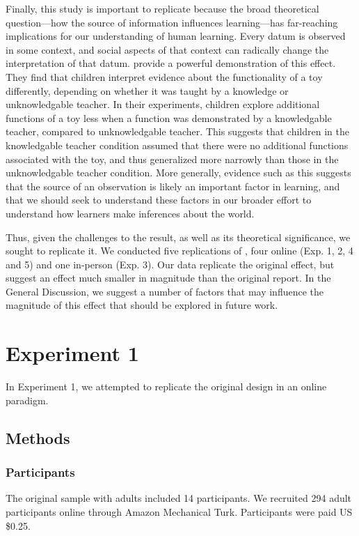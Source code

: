 \documentclass[man]{apa2}
\begin{document}
Finally, this study is important to replicate because the broad theoretical question---how the source of information influences learning---has far-reaching implications for our understanding of human learning. Every datum is observed in some context, and social aspects of that context can radically change the interpretation of that datum.  provide a powerful demonstration of this effect. They find that children interpret evidence about the functionality of a toy differently, depending on whether it was taught by a knowledge or unknowledgable teacher. In their experiments, children explore additional  functions of a toy less when a function was demonstrated by a knowledgable teacher, compared to unknowledgable teacher. This suggests that children in the knowledgable teacher condition assumed that there were no additional functions associated with the toy, and thus generalized more narrowly than those in the unknowledgable teacher condition. More generally, evidence such as this suggests that the source of an observation is likely an important factor in learning, and that we should seek to understand these factors in our broader effort to understand how learners make inferences about the world.

Thus, given the challenges to the  result, as well as its theoretical significance, we sought to replicate it. We conducted five replications of , four online (Exp. 1, 2,  4 and 5) and one in-person (Exp. 3). Our data replicate the original effect, but suggest an effect much smaller in magnitude than the original report. In the General Discussion, we suggest a number of factors that may influence the magnitude of this effect that should be explored in future work.
 
\section{Experiment 1} 
In Experiment 1, we attempted to replicate the original design in an online paradigm. 

\subsection{Methods}
\subsubsection{Participants} 
The original sample with adults included 14 participants. We recruited 294 adult participants online through Amazon Mechanical Turk. Participants were paid US \$0.25. 
\end{document}
